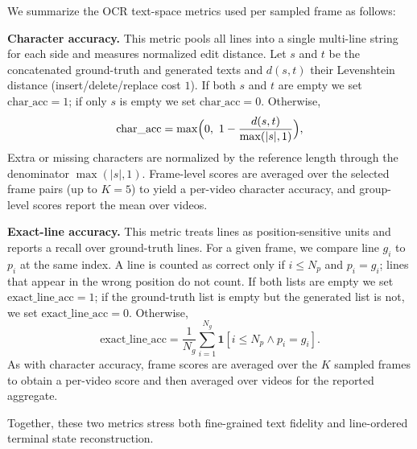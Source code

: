 We summarize the OCR text-space metrics used per sampled frame as follows:
\begin{tcolorbox}[
  colback=apricotglaze!40!white,
  colframe=metablue!40,
  interior style={shade,shading angle=315,left color=white,right color=apricotglaze!55!white},
  boxrule=0pt,
  borderline west={1pt}{0pt}{gray!60},
  left=6pt,right=4pt,top=3pt,bottom=3pt]
\small
\textbf{Character accuracy.} This metric pools all lines into a single multi-line string for each side and measures normalized edit distance.
Let $s$ and $t$ be the concatenated ground-truth and generated texts and $d(s,t)$ their Levenshtein distance (insert/delete/replace cost $1$).
If both $s$ and $t$ are empty we set $\text{char\_acc}=1$; if only $s$ is empty we set $\text{char\_acc}=0$.
Otherwise,
\[
  \text{char\_acc} = \max\Bigl(0,\ 1 - \frac{d(s,t)}{\max(|s|,1)}\Bigr),
\]
Extra or missing characters are normalized by the reference length through the denominator $\max(|s|,1)$.
Frame-level scores are averaged over the selected frame pairs (up to $K{=}5$) to yield a per-video character accuracy, and group-level scores report the mean over videos.

\textbf{Exact-line accuracy.} This metric treats lines as position-sensitive units and reports a recall over ground-truth lines.
For a given frame, we compare line $g_i$ to $p_i$ at the same index.
A line is counted as correct only if $i\le N_p$ and $p_i=g_i$; lines that appear in the wrong position do not count.
If both lists are empty we set $\text{exact\_line\_acc}=1$; if the ground-truth list is empty but the generated list is not, we set $\text{exact\_line\_acc}=0$.
Otherwise,
\[
  \text{exact\_line\_acc} = \frac{1}{N_g}\sum_{i=1}^{N_g} \mathbf{1}[i \le N_p \land p_i = g_i].
\]
As with character accuracy, frame scores are averaged over the $K$ sampled frames to obtain a per-video score and then averaged over videos for the reported aggregate.
\end{tcolorbox} 
Together, these two metrics stress both fine-grained text fidelity and line-ordered terminal state reconstruction.

